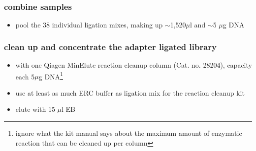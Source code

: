 \subsubsection
{combine samples}
\begin{itemize}
\item pool the 38 individual ligation mixes, making up $\sim$1,520$\mu$l and $\sim$5 $\mu$g DNA 
\end{itemize}




\subsubsection
{clean up and concentrate the adapter ligated library}
\begin{itemize}
\item with one Qiagen MinElute reaction cleanup column (Cat. no. 28204), capacity each 5$\mu$g DNA\footnote{ignore what the kit manual says about the maximum amount of enzymatic reaction that can be cleaned up per column}
\item use at least as much ERC buffer as ligation mix for the reaction cleanup kit 
\item elute with 15 $\mu$l EB
\end{itemize}

